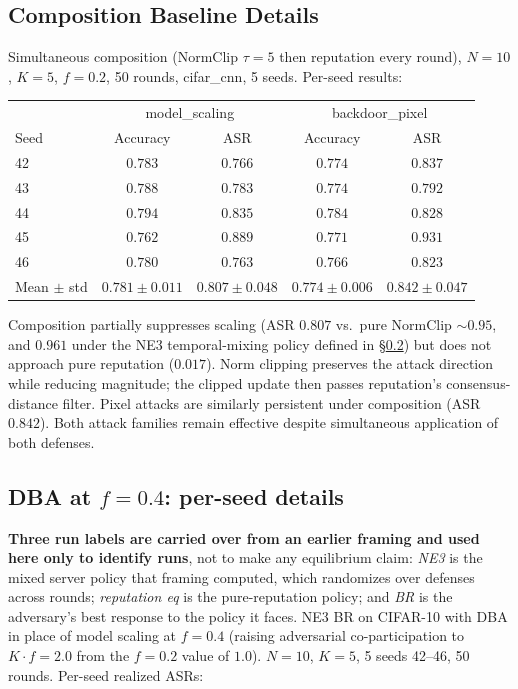 \documentclass{article}
\begin{document}
\subsection{Composition Baseline Details}
\label{app:composition}

Simultaneous composition (NormClip $\tau{=}5$ then reputation every round), $N{=}10$, $K{=}5$, $f{=}0.2$, 50 rounds, cifar\_cnn, 5 seeds. Per-seed results:
\begin{center}\small
\begin{tabular}{l|cc|cc}
\toprule
 & \multicolumn{2}{c|}{model\_scaling} & \multicolumn{2}{c}{backdoor\_pixel} \\
Seed & Accuracy & ASR & Accuracy & ASR \\
\midrule
42 & $0.783$ & $0.766$ & $0.774$ & $0.837$ \\
43 & $0.788$ & $0.783$ & $0.774$ & $0.792$ \\
44 & $0.794$ & $0.835$ & $0.784$ & $0.828$ \\
45 & $0.762$ & $0.889$ & $0.771$ & $0.931$ \\
46 & $0.780$ & $0.763$ & $0.766$ & $0.823$ \\
\midrule
Mean $\pm$ std & $0.781 \pm 0.011$ & $\mathbf{0.807 \pm 0.048}$ & $0.774 \pm 0.006$ & $\mathbf{0.842 \pm 0.047}$ \\
\bottomrule
\end{tabular}
\end{center}
Composition partially suppresses scaling (ASR $0.807$ vs.\ pure NormClip $\sim 0.95$, and $0.961$ under the NE3 temporal-mixing policy defined in §\ref{app:dba_f04}) but does not approach pure reputation ($0.017$). Norm clipping preserves the attack direction while reducing magnitude; the clipped update then passes reputation's consensus-distance filter. Pixel attacks are similarly persistent under composition (ASR $0.842$). Both attack families remain effective despite simultaneous application of both defenses.

\subsection{DBA at $f{=}0.4$: per-seed details}
\label{app:dba_f04}

\textbf{Three run labels are carried over from an earlier framing and used here only to identify runs}, not to make any equilibrium claim: \emph{NE3} is the mixed server policy that framing computed, which randomizes over defenses across rounds; \emph{reputation eq} is the pure-reputation policy; and \emph{BR} is the adversary's best response to the policy it faces. NE3 BR on CIFAR-10 with DBA in place of model scaling at $f{=}0.4$ (raising adversarial co-participation to $K \cdot f = 2.0$ from the $f{=}0.2$ value of $1.0$). $N{=}10$, $K{=}5$, 5 seeds 42--46, 50 rounds. Per-seed realized ASRs:
\end{document}

